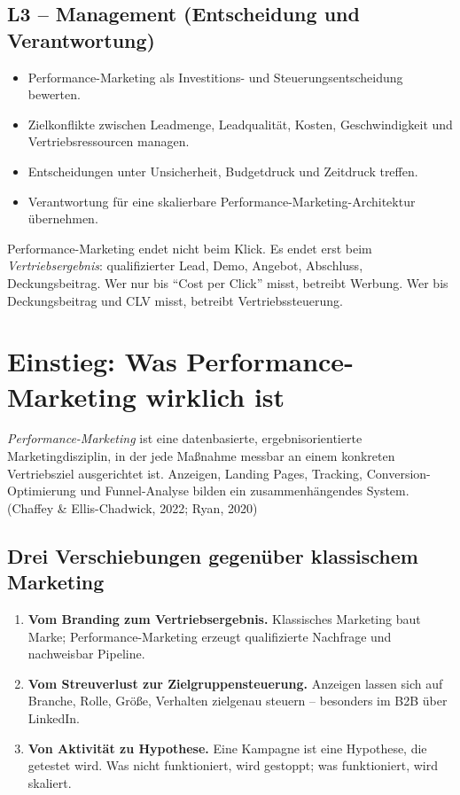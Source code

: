 \documentclass[11pt,a4paper,oneside]{article}
\newcommand{\fachbegriff}[1]{\textbf{#1}}
\newcommand{\quelle}[1]{{\footnotesize\color{lpGray}(#1)}}
\begin{document}
\subsection*{L3 -- Management (Entscheidung und Verantwortung)}
\begin{itemize}
  \item Performance-Marketing als Investitions- und Steuerungsentscheidung bewerten.
  \item Zielkonflikte zwischen Leadmenge, Leadqualität, Kosten, Geschwindigkeit und Vertriebsressourcen managen.
  \item Entscheidungen unter Unsicherheit, Budgetdruck und Zeitdruck treffen.
  \item Verantwortung für eine skalierbare Performance-Marketing-Architektur übernehmen.
\end{itemize}

\begin{merkbox}
Performance-Marketing endet nicht beim Klick. Es endet erst beim \emph{Vertriebsergebnis}: qualifizierter Lead, Demo, Angebot, Abschluss, Deckungsbeitrag. Wer nur bis ``Cost per Click'' misst, betreibt Werbung. Wer bis Deckungsbeitrag und CLV misst, betreibt Vertriebssteuerung.
\end{merkbox}

\clearpage

\section{Einstieg: Was Performance-Marketing wirklich ist}

\emph{Performance-Marketing} ist eine datenbasierte, ergebnisorientierte Marketingdisziplin, in der jede Maßnahme messbar an einem konkreten Vertriebsziel ausgerichtet ist. Anzeigen, Landing Pages, Tracking, Conversion-Optimierung und Funnel-Analyse bilden ein zusammenhängendes System. \quelle{Chaffey \& Ellis-Chadwick, 2022; Ryan, 2020}

\subsection{Drei Verschiebungen gegenüber klassischem Marketing}

\begin{enumerate}
  \item \fachbegriff{Vom Branding zum Vertriebsergebnis.} Klassisches Marketing baut Marke; Performance-Marketing erzeugt qualifizierte Nachfrage und nachweisbar Pipeline.
  \item \fachbegriff{Vom Streuverlust zur Zielgruppensteuerung.} Anzeigen lassen sich auf Branche, Rolle, Größe, Verhalten zielgenau steuern -- besonders im B2B über LinkedIn.
  \item \fachbegriff{Von Aktivität zu Hypothese.} Eine Kampagne ist eine Hypothese, die getestet wird. Was nicht funktioniert, wird gestoppt; was funktioniert, wird skaliert.
\end{enumerate}
\end{document}
